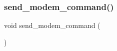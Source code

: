\subsubsection{\texorpdfstring{send\+\_\+modem\+\_\+command()}{send\_modem\_command()}}
{\footnotesize\ttfamily void send\+\_\+modem\+\_\+command (\begin{DoxyParamCaption}{ }\end{DoxyParamCaption})}

